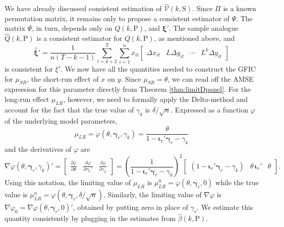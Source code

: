 We have already discussed consistent estimation of $\widehat{\mathcal{V}}(k,\text{S})$.
Since $\Pi$ is a known permutation matrix, it remains only to propose a consistent estimator of $\Psi$. 
The matrix $\Psi$, in turn, depends only on $Q(k,\text{P})$, and $\boldsymbol{\xi}'$.
The sample analogue $\widehat{Q}(k,\text{P})$ is a consistent estimator for $Q(k,\text{P})$, as mentioned above, and
\begin{equation}
  \widehat{\boldsymbol{\xi}}' = \frac{1}{n(T - k - 1)} \sum_{t = k+2}^T \sum_{i=1}^n x_{it}\left[
  \begin{array}{cccc}
    \Delta x_{it} & L \Delta y_{it} & \cdots & L^{k} \Delta y_{it} 
  \end{array}
\right]
\end{equation}
is consistent for $\xi'$.
We now have all the quantities needed to construct the GFIC for $\mu_{SR}$, the short-run effect of $x$ on $y$.
Since $\mu_{SR} = \theta$, we can read off the AMSE expression for this parameter directly from Theorem \ref{thm:limitDpanel}.
For the long-run effect $\mu_{LR}$, however, we need to formally apply the Delta-method and account for the fact that the true value of $\gamma_k$ is $\delta/\sqrt{n}$.
Expressed as a function $\varphi$ of the underlying model parameters, 
\[
  \mu_{LR} = \varphi(\theta, \boldsymbol{\gamma}_r, \gamma_k) = \frac{\theta}{1 - \boldsymbol{\iota}_r' \boldsymbol{\gamma}_r - \gamma_k}
\]
and the derivatives of $\varphi$ are
\[
  \nabla \varphi(\theta, \boldsymbol{\gamma}_r, \gamma_k)' = \left[
  \begin{array}{ccc}
    \displaystyle\frac{\partial \varphi}{\partial \theta} & 
    \displaystyle\frac{\partial \varphi}{\partial \boldsymbol{\gamma}_r'} &
    \displaystyle\frac{\partial \varphi}{\partial \gamma_k} 
  \end{array}
\right] = 
\left( \frac{1}{1 - \boldsymbol{\iota}_r' \boldsymbol{\gamma}_r - \gamma_k} \right)^2 \left[
\begin{array}{ccc}
  \left( 1 - \boldsymbol{\iota}_r' \boldsymbol{\gamma}_r - \gamma_k \right) & \theta \,\boldsymbol{\iota}_r' & \theta 
\end{array}
\right].
\]
Using this notation, the limiting value of $\mu_{LR}$ is $\mu_{LR}^{0} =  \varphi(\theta, \boldsymbol{\gamma}_r, 0)$
while the true value is
$\mu_{LR}^{n} = \varphi(\theta, \boldsymbol{\gamma}_r, \delta/\sqrt{n})$.
Similarly, the limiting value of $\nabla\varphi$ is $\nabla \varphi_0 = \nabla \varphi(\theta, \boldsymbol{\gamma}_r, 0)'$, obtained by putting zero in place of $\gamma_r$. 
We estimate this quantity consistently by plugging in the estimates from $\widehat{\beta}(k, \text{P})$.

